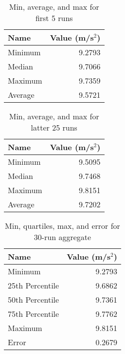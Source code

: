 \begin{table}[ht]
    \centering
    \begin{tabular}{|l|r|}
        \hline
        \textbf{Name} & \textbf{Value} (m/s$^{2}$) \\
        \hline
        Minimum & 9.2793 \\
        Median & 9.7066 \\
        Maximum & 9.7359 \\
        Average & 9.5721 \\
        \hline
    \end{tabular}
    \caption{Min, average, and max for first 5 runs}
    \label{table:01.describe.5}
\end{table}
\begin{table}[ht]
    \centering
    \begin{tabular}{|l|r|}
        \hline
        \textbf{Name} & \textbf{Value} (m/s$^{2}$) \\
        \hline
        Minimum & 9.5095 \\
        Median & 9.7468 \\
        Maximum & 9.8151 \\
        Average & 9.7202 \\
        \hline
    \end{tabular}
    \caption{Min, average, and max for latter 25 runs}
    \label{table:01.describe.25}
\end{table}
\begin{table}[ht]
    \centering
    \begin{tabular}{|l|r|}
        \hline
        \textbf{Name} & \textbf{Value} (m/s$^{2}$) \\
        \hline
        Minimum & 9.2793 \\
        25th Percentile & 9.6862 \\
        50th Percentile & 9.7361 \\
        75th Percentile & 9.7762 \\
        Maximum & 9.8151 \\
        Error & 0.2679 \\
        \hline
    \end{tabular}
    \caption{Min, quartiles, max, and error for 30-run aggregate}
    \label{table:01.describe.30}
\end{table}
